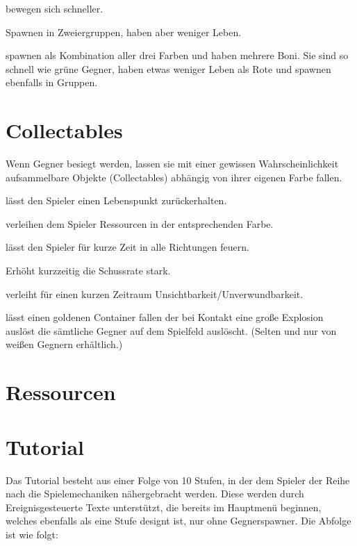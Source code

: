 \documentclass[a4paper,10pt,ngerman,fontsize=12pt]{scrreprt}
\begin{document}
{bewegen sich schneller.}

{Spawnen in Zweiergruppen, haben aber weniger Leben.}

{spawnen als Kombination aller drei Farben und haben mehrere Boni. Sie sind so schnell wie grüne Gegner, haben etwas weniger Leben als Rote und spawnen ebenfalls in Gruppen.}




\section{Collectables}

Wenn Gegner besiegt werden, lassen sie mit einer gewissen Wahrscheinlichkeit aufsammelbare Objekte (Collectables) abhängig von ihrer eigenen Farbe fallen.

\renewcommand{\itmspace}{5.5em}
{lässt den Spieler einen Lebenspunkt zurückerhalten.}

{verleihen dem Spieler Ressourcen in der entsprechenden Farbe.}

{lässt den Spieler für kurze Zeit in alle Richtungen feuern.}

{Erhöht kurzzeitig die Schussrate stark.}

{verleiht für einen kurzen Zeitraum Unsichtbarkeit/Unverwundbarkeit.}

{lässt einen goldenen Container fallen der bei Kontakt eine gro{\ss}e Explosion auslöst die sämtliche Gegner auf dem Spielfeld auslöscht. (Selten und nur von wei{\ss}en Gegnern erhältlich.)}




\section{Ressourcen}




\section{Tutorial}

Das Tutorial besteht aus einer Folge von 10 Stufen, in der dem Spieler der Reihe nach die Spielemechaniken nähergebracht werden. Diese werden durch Ereignisgesteuerte Texte unterstützt, die bereits im Hauptmenü beginnen, welches ebenfalls als eine Stufe designt ist, nur ohne Gegnerspawner. Die Abfolge ist wie folgt:
\end{document}
